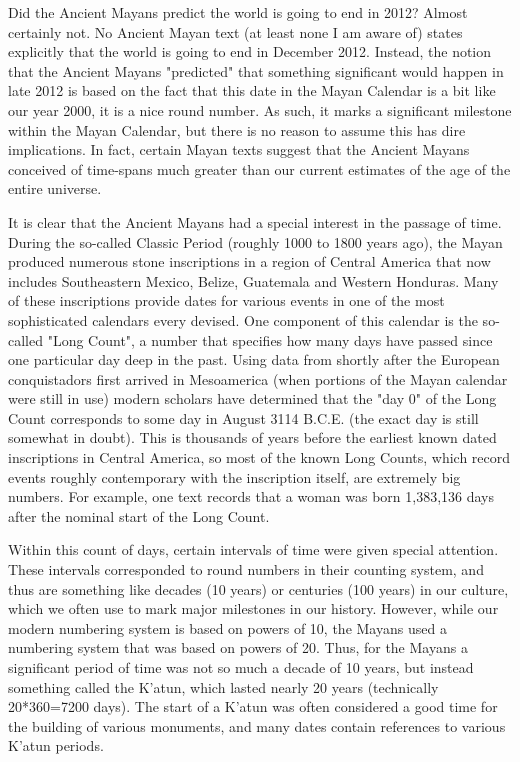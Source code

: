 Did the Ancient Mayans predict the world is going to end in 2012? Almost certainly not. No Ancient Mayan text (at least none I am aware of) states explicitly that the world is going to end in December 2012. Instead, the notion that the Ancient Mayans "predicted" that something significant would happen in late 2012 is based on the fact that this date in the Mayan Calendar is a bit like our year 2000, it is a nice round number. As such, it marks a significant milestone within the Mayan Calendar, but there is no reason to assume this has dire implications. In fact, certain Mayan texts suggest that the Ancient Mayans conceived of time-spans much greater than our current estimates of the age of the entire universe.

It is clear that the Ancient Mayans had a special interest in the passage of time. During the so-called Classic Period (roughly 1000 to 1800 years ago), the Mayan produced numerous stone inscriptions in a region of Central America that now includes Southeastern Mexico, Belize, Guatemala and Western Honduras. Many of these inscriptions provide dates for various events in one of the most sophisticated calendars every devised. One component of this calendar is the so-called "Long Count", a number that specifies how many days have passed since one particular day deep in the past. Using data from shortly after the European conquistadors first arrived in Mesoamerica (when portions of the Mayan calendar were still in use) modern scholars have determined that the "day 0" of the Long Count corresponds to some day in August 3114 B.C.E. (the exact day is still somewhat in doubt). This is thousands of years before the earliest known dated inscriptions in Central America,  so most of the known Long Counts, which record events roughly contemporary with the inscription itself, are extremely big numbers. For example, one text records that a woman was born 1,383,136 days after the nominal start of the Long Count.

Within this count of days, certain intervals of time were given special attention. These intervals corresponded to round numbers in their counting system, and thus are something like decades (10 years) or centuries (100 years) in our culture, which we often use to mark major milestones in our history.  However, while our modern numbering system is based on powers of 10,  the Mayans used a numbering system that was based on powers of 20. Thus, for the Mayans a significant period of time was not so much a decade of 10 years, but instead something called the K'atun, which lasted nearly 20 years (technically 20*360=7200 days). The start of a K'atun was often considered a good time for the building of various monuments, and many dates contain references to various K'atun periods. 

